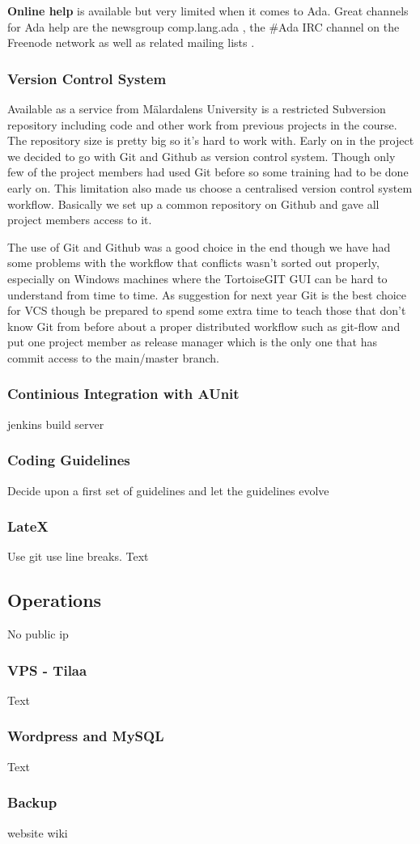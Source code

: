 \textbf{Online help} is available but very limited when it comes to Ada. Great
channels for Ada help are the newsgroup comp.lang.ada \cite{web:comp.lang.ada},
the \#Ada IRC channel on the Freenode network as well as related mailing lists
\cite{web:avr-ada-devel,web:debian-ada-devel}.

\subsubsection{Version Control System}
Available as a service from M\"{a}lardalens University is a restricted Subversion repository
including code and other work from previous projects in the course. The repository
size is pretty big so it's hard to work with. Early on in the project we decided
to go with Git and Github as version control system. Though only few of the project
members had used Git before so some training had to be done early on. This limitation
also made us choose a centralised version control system workflow. Basically
we set up a common repository on Github \cite{web:github_naiad-auv-software}
and gave all project members access to it.

The use of Git and Github was a good choice in the end though we have had some
problems with the workflow that conflicts wasn't sorted out properly, especially
on Windows machines where the TortoiseGIT GUI can be hard to understand from time
to time. As suggestion for next year Git is the best choice for VCS though be prepared to
spend some extra time to teach those that don't know Git from before about a proper
distributed workflow such as git-flow \cite{web:git-flow} and put one project member
as release manager which is the only one that has commit access to the main/master branch.

\subsubsection{Continious Integration with AUnit}
jenkins build server

\subsubsection{Coding Guidelines}
Decide upon a first set of guidelines and let the guidelines evolve

\subsubsection{LateX}
Use git
use line breaks.
Text

\subsection{Operations}
No public ip

\subsubsection{VPS - Tilaa}
Text
\subsubsection{Wordpress and MySQL}
Text
\subsubsection{Backup}
website
wiki

